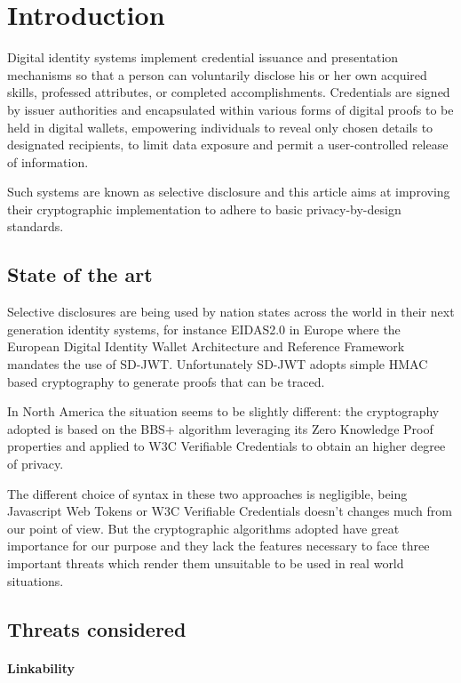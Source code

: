 \documentclass[conference]{IEEEtran}
\begin{document}
\section{Introduction}
Digital identity systems implement credential issuance and presentation mechanisms so that a person can voluntarily disclose his or her own acquired skills, professed attributes, or completed accomplishments. Credentials are signed by issuer authorities and encapsulated within various forms of digital proofs to be held in digital wallets, empowering individuals to reveal only chosen details to designated recipients, to limit data exposure and permit a user-controlled release of information.

Such systems are known as selective disclosure and this article aims at improving their cryptographic implementation to adhere to basic privacy-by-design standards.

\subsection{State of the art}

Selective disclosures are being used by nation states across the world in their next generation identity systems, for instance EIDAS2.0 in Europe where the European Digital Identity Wallet Architecture and Reference Framework\cite{eudi-arf} mandates the use of SD-JWT\cite{sd-jwt}. Unfortunately SD-JWT adopts simple HMAC based cryptography to generate proofs that can be traced.

In North America the situation seems to be slightly different: the cryptography adopted is based on the BBS+ algorithm\cite{bbs+} leveraging its Zero Knowledge Proof properties and applied to W3C Verifiable Credentials\cite{w3c-vc} to obtain an higher degree of privacy.

The different choice of syntax in these two approaches is negligible, being Javascript Web Tokens or W3C Verifiable Credentials doesn't changes much from our point of view. But the cryptographic algorithms adopted have great importance for our purpose and they lack the features necessary to face three important threats which render them unsuitable to be used in real world situations.

\subsection{Threats considered}

\paragraph{Linkability}
\end{document}
